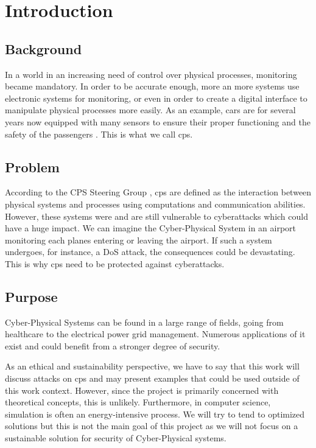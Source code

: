 \documentclass[12pt]{report}
\begin{document}

\printglossaries

\tableofcontents

\chapter{Introduction}
\section{Background}
\label{sec:intr:bg}
In a world in an increasing need of control over physical processes, monitoring became mandatory. In order to be accurate enough, more an more systems use electronic systems for monitoring, or even in order to create a digital interface to manipulate physical processes more easily. As an example, cars are for several years now equipped with many sensors to ensure their proper functioning and the safety of the passengers \cite{1435746}. This is what we call \gls{cps}. 


\section{Problem}
\label{sec:intr:pb}
According to the CPS Steering Group \cite{cps_steering_group_cyber-physical_2008}, \gls{cps} are defined as the interaction between physical systems and processes using computations and communication abilities. However, these systems were and are still vulnerable to cyberattacks \cite{wang_security_2010} \cite{singh_review_2020} which could have a huge impact. We can imagine the Cyber-Physical System in an airport monitoring each planes entering or leaving the airport. If such a system undergoes, for instance, a DoS attack, the consequences could be devastating. This is why \gls{cps} need to be protected against cyberattacks. 

\section{Purpose}
\label{sec:intr:purp}
Cyber-Physical Systems can be found in a large range of fields, going from healthcare to the electrical power grid management. Numerous applications of it exist and could benefit from a stronger degree of security.

As an ethical and sustainability perspective, we have to say that this work will discuss attacks on \gls{cps} and may present examples that could be used outside of this work context. However, since the project is primarily concerned with theoretical concepts, this is unlikely. Furthermore, in computer science, simulation is often an energy-intensive process. We will try to tend to optimized solutions but this is not the main goal of this project as we will not focus on a sustainable solution for security of Cyber-Physical systems.
\end{document}
